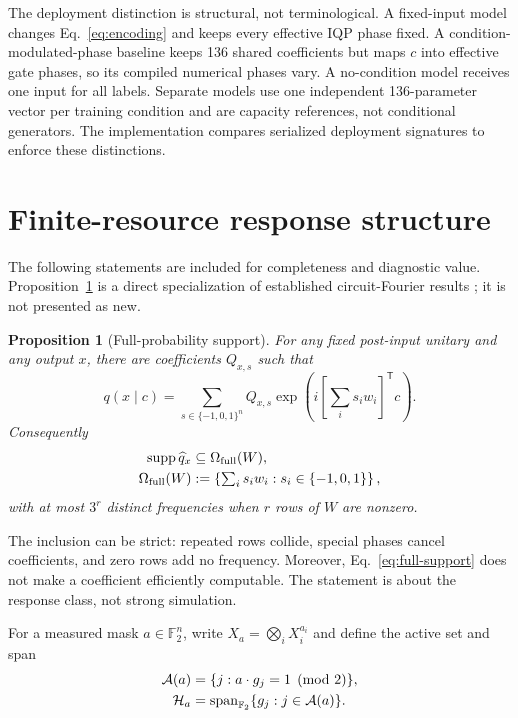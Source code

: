 \documentclass[a4paper,twocolumn,11pt,unpublished]{quantumarticle}
\newtheorem{proposition}{Proposition}
\newcommand{\Ftwo}{\mathbb{F}_2}
\newcommand{\supp}{\operatorname{supp}}
\begin{document}
The deployment distinction is structural, not terminological.  A fixed-input
model changes Eq.~\eqref{eq:encoding} and keeps every effective IQP phase
fixed.  A condition-modulated-phase baseline keeps 136 shared coefficients but
maps $c$ into effective gate phases, so its compiled numerical phases vary.
A no-condition model receives one input for all labels.  Separate models use
one independent 136-parameter vector per training condition and are capacity
references, not conditional generators.  The implementation compares
serialized deployment signatures to enforce these distinctions.

\section{Finite-resource response structure}
\label{sec:response}

The following statements are included for completeness and diagnostic value.
Proposition~\ref{prop:full-support} is a direct specialization of established
circuit-Fourier results
\cite{gilVidalInputRedundancy2020,schuldEffectDataEncoding2021}; it is not
presented as new.

\begin{proposition}[Full-probability support]
\label{prop:full-support}
For any fixed post-input unitary and any output $x$, there are coefficients
$Q_{x,s}$ such that
\begin{equation}
 q(x\mid c)=\sum_{s\in\{-1,0,1\}^n}Q_{x,s}
 \exp\!\left(i\left[\sum_i s_iw_i\right]^\mathsf{T}c\right).
 \label{eq:full-support}
\end{equation}
Consequently
\begin{align}
 \supp\widehat q_x&\subseteq\Omega_{\mathrm{full}}(W),\notag\\
 \Omega_{\mathrm{full}}(W)
   &:=\left\{\textstyle\sum_i s_iw_i:s_i\in\{-1,0,1\}\right\},
 \label{eq:omega-full}
\end{align}
with at most $3^r$ distinct frequencies when $r$ rows of $W$ are nonzero.
\end{proposition}

The inclusion can be strict: repeated rows collide, special phases cancel
coefficients, and zero rows add no frequency.  Moreover, Eq.~\eqref{eq:full-support}
does not make a coefficient efficiently computable.  The statement is about
the response class, not strong simulation.

For a measured mask $a\in\Ftwo^n$, write
$X_a=\bigotimes_iX_i^{a_i}$ and define the active set and span
\begin{align}
 \mathcal A(a)&=\{j:a\cdot g_j=1\pmod 2\},\notag\\
 \mathcal H_a&=\operatorname{span}_{\Ftwo}
   \{g_j:j\in\mathcal A(a)\}.
\end{align}
\end{document}
